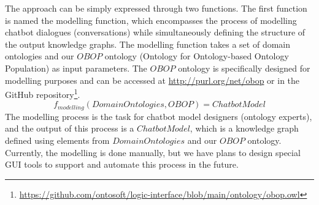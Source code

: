 \documentclass[runningheads]{llncs}
\begin{document}
The approach can be simply expressed through two functions. The first function is named the modelling function, which encompasses the process of modelling chatbot dialogues (conversations) while simultaneously defining the structure of the output knowledge graphs. The modelling function takes a set of domain ontologies and our $OBOP$ ontology (Ontology for Ontology-based Ontology Population) as input parameters. The $OBOP$ ontology is specifically designed for modelling purposes and can be accessed at \url{http://purl.org/net/obop} or in the GitHub repository\footnote{\url{https://github.com/ontosoft/logic-interface/blob/main/ontology/obop.owl}}.
$$ f_{modelling}(DomainOntologies, OBOP) = ChatbotModel$$
The modelling process is the task for chatbot model designers (ontology experts), and the output of this process is a $ChatbotModel$, which is a knowledge graph defined using elements from $DomainOntologies$ and our $OBOP$ ontology. Currently, the modelling is done manually, but we have plans to design special GUI tools to support and automate this process in the future.  
\end{document}
